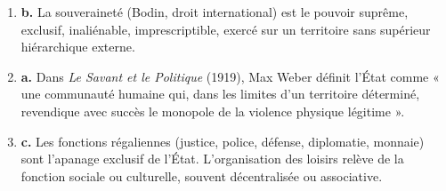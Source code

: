 \documentclass[11pt]{article}
\newcommand{\cle}[1]{{\popxbold\color{popdark}#1}}
\begin{document}
\begin{exoresolu}
\begin{enumerate}
\item \textbf{b.} La \cle{souveraineté} (Bodin, droit international) est le pouvoir suprême, exclusif, inaliénable, imprescriptible, exercé sur un territoire sans supérieur hiérarchique externe.
\item \textbf{a.} Dans \emph{Le Savant et le Politique} (1919), Max Weber définit l'État comme « une communauté humaine qui, dans les limites d'un territoire déterminé, revendique avec succès le \cle{monopole de la violence physique légitime} ».
\item \textbf{c.} Les \cle{fonctions régaliennes} (justice, police, défense, diplomatie, monnaie) sont l'apanage exclusif de l'État. L'organisation des loisirs relève de la fonction sociale ou culturelle, souvent décentralisée ou associative.
\end{enumerate}
\end{exoresolu}
\end{document}

